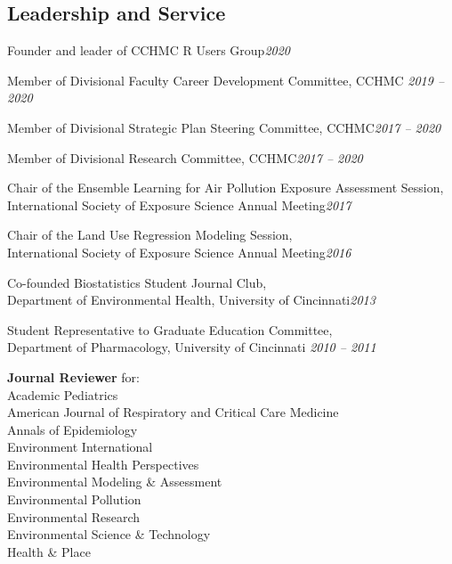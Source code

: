 \documentclass[margin,line]{res}
\newenvironment{list3}{
  \begin{list}{}{%
      \setlength{\itemsep}{0in}
      \setlength{\parsep}{0in} \setlength{\parskip}{0in}
      \setlength{\topsep}{0in} \setlength{\partopsep}{0in}
      \setlength{\leftmargin}{0in}}}{\end{list}}
\begin{document}
\begin{resume}
\section{\sc Leadership and Service}
\begin{list3} \itemsep 4pt
  \item[] Founder and leader of CCHMC R Users Group\hfill \textit{2020}
\item[] Member of Divisional Faculty Career Development Committee, CCHMC\hfill
  \textit{2019 -- 2020}
\item[] Member of Divisional Strategic Plan Steering Committee, CCHMC\hfill \textit{2017 -- 2020}
\item[] Member of Divisional Research Committee, CCHMC\hfill \textit{2017 -- 2020}
\item[] Chair of the Ensemble Learning for Air Pollution Exposure Assessment Session, \\International Society of Exposure Science Annual Meeting\hfill \textit{2017}
\item[] Chair of the Land Use Regression Modeling Session, \\International Society of Exposure Science Annual Meeting\hfill \textit{2016}
\item[] Co-founded Biostatistics Student Journal Club, \\Department of Environmental Health, University of Cincinnati\hfill \textit{2013}
\item[] Student Representative to Graduate Education Committee, \\Department of Pharmacology, University of Cincinnati \hfill \textit{2010 -- 2011}
\item[] \textbf{Journal Reviewer} for: \\
        Academic Pediatrics \\
        American Journal of Respiratory and Critical Care Medicine \\
        Annals of Epidemiology \\
        Environment International \\
        Environmental Health Perspectives \\
        Environmental Modeling \& Assessment \\
        Environmental Pollution \\
        Environmental Research \\
        Environmental Science \& Technology \\
        Health \& Place \\

\end{list3}
\end{resume}
\end{document}
